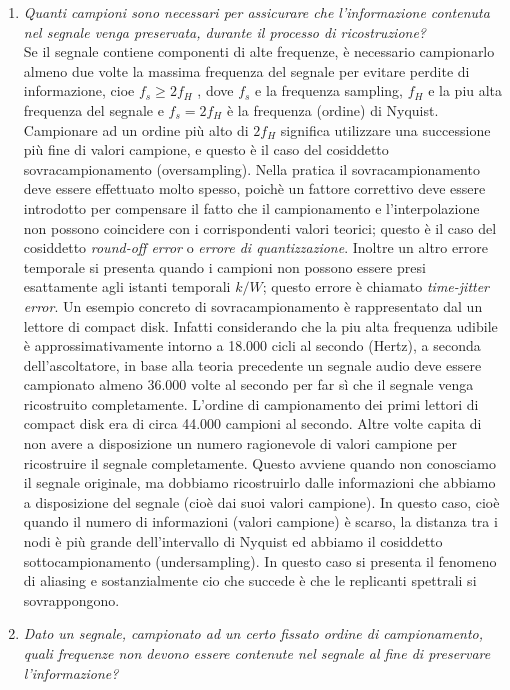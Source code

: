 \begin{enumerate}
    \item \textit{Quanti campioni sono necessari per assicurare che l’informazione
        contenuta nel segnale venga preservata, durante il processo di ricostruzione?}\\

        Se il segnale contiene componenti di alte frequenze, è necessario campionarlo almeno
        due volte la massima frequenza del segnale per evitare perdite di informazione,
        cioe $f_s \ge 2 f_H$ , dove $f_s$ e la frequenza sampling, $f_H$ e la piu alta
        frequenza del segnale e $f_s = 2 f_H$ è la frequenza (ordine) di Nyquist.
        Campionare ad un ordine più alto di $2 f_H$ significa utilizzare una successione
        più fine di valori campione, e questo è il caso del cosiddetto sovracampionamento (oversampling).
        Nella pratica il sovracampionamento deve essere effettuato molto spesso, poichè
        un fattore correttivo deve essere introdotto per compensare il fatto che il
        campionamento e l’interpolazione non possono coincidere con i corrispondenti valori
        teorici; questo è il caso del cosiddetto \textit{round-off error} o \textit{errore di
        quantizzazione}. Inoltre un altro errore temporale si presenta quando i campioni
        non possono essere presi esattamente agli istanti temporali $k/W$; questo errore è
        chiamato \textit{time-jitter error}.
        Un esempio concreto di sovracampionamento è rappresentato dal un lettore di compact disk.
        Infatti considerando che la piu alta frequenza
        udibile è approssimativamente intorno a 18.000 cicli al secondo (Hertz),
        a seconda dell’ascoltatore, in base alla teoria precedente un segnale audio
        deve essere campionato almeno 36.000 volte al secondo per far sì che
        il segnale venga ricostruito completamente. L’ordine di campionamento
        dei primi lettori di compact disk era di circa 44.000 campioni al secondo.
        Altre volte capita di non avere a disposizione un numero ragionevole di valori
        campione per ricostruire il segnale completamente. Questo
        avviene quando non conosciamo il segnale originale, ma dobbiamo ricostruirlo dalle
        informazioni che abbiamo a disposizione del segnale (cioè
        dai suoi valori campione). In questo caso, cioè quando il numero di
        informazioni (valori campione) è scarso, la distanza tra i nodi è più
        grande dell’intervallo di Nyquist ed abbiamo il cosiddetto sottocampionamento
        (undersampling). In questo caso si presenta il fenomeno di
        aliasing e sostanzialmente cio che succede è che le replicanti spettrali si
        sovrappongono.
    \item \textit{Dato un segnale, campionato ad un certo fissato ordine di campionamento,
        quali frequenze non devono essere contenute nel segnale al fine di preservare
        l’informazione?}\\


\end{enumerate}

